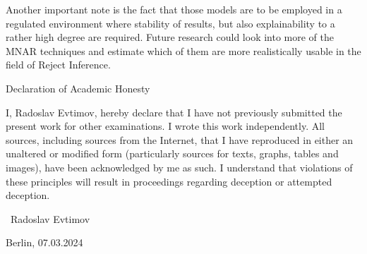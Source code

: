 \documentclass[11pt,a4paper]{article}
\begin{document}
Another important note is the fact that those models are to be employed in a regulated environment where stability of results, but also explainability to a rather high degree are required.  
Future research could look into more of the MNAR techniques and estimate which of them are more realistically usable in the field of Reject Inference. 












    \newpage
\thispagestyle{empty}

\LARGE
Declaration of Academic Honesty
\vspace{1 cm}

\normalsize
I, Radoslav Evtimov, hereby declare that I have not previously submitted
the present work for other examinations. I wrote this work independently. All sources, including sources from the Internet, that I have reproduced in either an unaltered or modified form (particularly sources for texts, graphs, tables and images), have been acknowledged by me as such. I understand that violations of these principles will result in proceedings regarding deception or attempted deception.

\vspace{4 cm}

    

\raggedright\ Radoslav Evtimov\par \newline
Berlin, 07.03.2024
\end{document}
